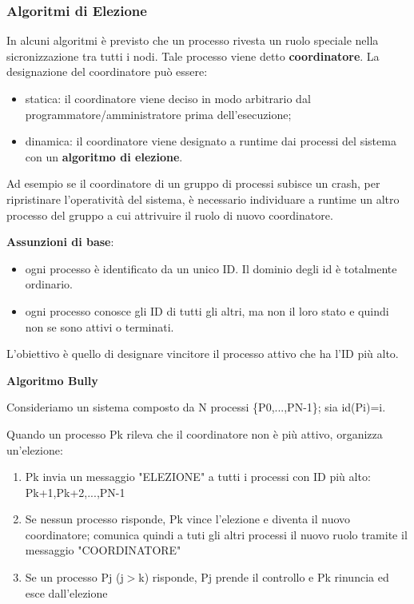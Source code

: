 \documentclass{article}
\begin{document}
\subsubsection{Algoritmi di Elezione}

In alcuni algoritmi è previsto che un processo rivesta un ruolo speciale nella sicronizzazione tra tutti i nodi. Tale processo viene detto \textbf{coordinatore}.
La designazione del coordinatore può essere:
\begin{itemize}
    \item statica: il coordinatore viene deciso in modo arbitrario dal programmatore/amministratore prima dell'esecuzione;
    \item dinamica: il coordinatore viene designato a runtime dai processi del sistema con un \textbf{algoritmo di elezione}.
\end{itemize}

\vspace{3mm}
Ad esempio se il coordinatore di un gruppo di processi subisce un crash, per ripristinare l'operatività del sistema, è necessario individuare a runtime un altro processo 
del gruppo a cui attrivuire il ruolo di nuovo coordinatore.

\vspace{3mm}
\textbf{Assunzioni di base}:
\begin{itemize}
    \item ogni processo è identificato da un unico ID. Il dominio degli id è totalmente ordinario.
    \item ogni processo conosce gli ID di tutti gli altri, ma non il loro stato e quindi non se sono attivi o terminati.
\end{itemize}

L'obiettivo è quello di designare vincitore il processo attivo che ha l'ID più alto.

\vspace{5mm}
\textbf{Algoritmo Bully}

\vspace{3mm}
Consideriamo un sistema composto da N processi \{P0,...,PN-1\}; sia id(Pi)=i.

Quando un processo Pk rileva che il coordinatore non è più attivo, organizza un'elezione:
\begin{enumerate}
    \item Pk invia un messaggio "ELEZIONE" a tutti i processi con ID più alto: Pk+1,Pk+2,...,PN-1
    \item Se nessun processo risponde, Pk vince l'elezione e diventa il nuovo coordinatore; comunica quindi a tuti gli altri processi il nuovo ruolo tramite
    il messaggio "COORDINATORE"
    \item Se un processo Pj (j$>$k) risponde, Pj prende il controllo e Pk rinuncia ed esce dall'elezione
\end{enumerate}
\end{document}

